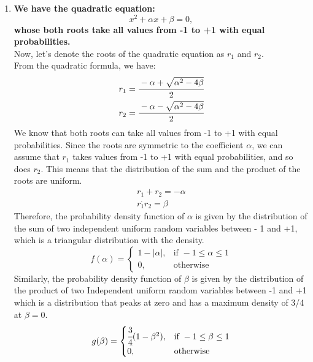 \documentclass{article}
\begin{document}
\begin{enumerate}
\newpage
\item
    \textbf{We have the quadratic equation:
        \[
            x^2 + \alpha x + \beta = 0,
        \]
        whose both roots take all values from -1 to +1 with equal probabilities.}\\
        Now, let's denote the roots of the quadratic equation as $r_1$ and $r_2$.\\
        From the quadratic formula, we have:
        \begin{align}
            r_1 =\cfrac{-\alpha + \sqrt{\alpha^2 - 4\beta}}{2}\\
            r_2 =\cfrac{-\alpha - \sqrt{\alpha^2 - 4\beta}}{2}
        \end{align}
        We know that both roots can take all values from -1 to +1 with equal probabilities. Since the roots are symmetric to the coefficient $\alpha$, we can assume that $r_1$ takes values from -1 to +1 with equal probabilities, and so does $r_2$. This means that the distribution of the sum and the product of the roots are uniform.
        \begin{align}
            r_1 + r_2 = -\alpha\\
            r_1^\cdot r_2 = \beta
        \end{align}
        Therefore, the probability density function of \(\alpha\) is given by the distribution of the sum of two independent uniform random variables between - 1 and +1, which is a triangular distribution with the density.
        \[
            f(\alpha) = \begin{cases}
            1 - |\alpha|, & \text{if } -1\le \alpha \le1\\
            0, & \text{otherwise}
            \end{cases}
        \]
        Similarly, the probability density function of $\beta$ is given by the distribution of the product of two Independent uniform random variables between -1 and +1 which is a distribution that peaks at zero and has a maximum density of 3/4 at $\beta = 0$.
        \[
            g(\beta) = \begin{cases}
            \cfrac{3}{4} (1 - \beta^2), & \text{if } -1\le \beta \le1\\
            0, & \text{otherwise}
            \end{cases}
        \]
        
\end{enumerate}
\end{document}
